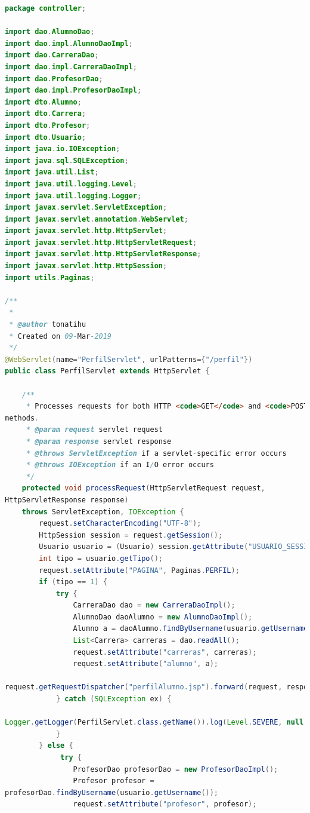 \documentclass[a4paper,12pt]{article}
\begin{document}
\begin{lstlisting}[language=Java, style=customJava, 
caption={PerfilServlet.java}, captionpos=b,basicstyle=\fontfamily{cmss}\small]
package controller;

import dao.AlumnoDao;
import dao.impl.AlumnoDaoImpl;
import dao.CarreraDao;
import dao.impl.CarreraDaoImpl;
import dao.ProfesorDao;
import dao.impl.ProfesorDaoImpl;
import dto.Alumno;
import dto.Carrera;
import dto.Profesor;
import dto.Usuario;
import java.io.IOException;
import java.sql.SQLException;
import java.util.List;
import java.util.logging.Level;
import java.util.logging.Logger;
import javax.servlet.ServletException;
import javax.servlet.annotation.WebServlet;
import javax.servlet.http.HttpServlet;
import javax.servlet.http.HttpServletRequest;
import javax.servlet.http.HttpServletResponse;
import javax.servlet.http.HttpSession;
import utils.Paginas;

/**
 *
 * @author tonatihu
 * Created on 09-Mar-2019
 */
@WebServlet(name="PerfilServlet", urlPatterns={"/perfil"})
public class PerfilServlet extends HttpServlet {
   
    /** 
     * Processes requests for both HTTP <code>GET</code> and <code>POST</code> 
methods.
     * @param request servlet request
     * @param response servlet response
     * @throws ServletException if a servlet-specific error occurs
     * @throws IOException if an I/O error occurs
     */
    protected void processRequest(HttpServletRequest request, 
HttpServletResponse response)
    throws ServletException, IOException {
        request.setCharacterEncoding("UTF-8");
        HttpSession session = request.getSession();
        Usuario usuario = (Usuario) session.getAttribute("USUARIO_SESSION");
        int tipo = usuario.getTipo();
        request.setAttribute("PAGINA", Paginas.PERFIL);
        if (tipo == 1) {
            try {
                CarreraDao dao = new CarreraDaoImpl();
                AlumnoDao daoAlumno = new AlumnoDaoImpl();
                Alumno a = daoAlumno.findByUsername(usuario.getUsername());
                List<Carrera> carreras = dao.readAll();
                request.setAttribute("carreras", carreras);
                request.setAttribute("alumno", a);
                
request.getRequestDispatcher("perfilAlumno.jsp").forward(request, response);
            } catch (SQLException ex) {
                
Logger.getLogger(PerfilServlet.class.getName()).log(Level.SEVERE, null, ex);
            }
        } else {
             try {
                ProfesorDao profesorDao = new ProfesorDaoImpl();
                Profesor profesor = 
profesorDao.findByUsername(usuario.getUsername());
                request.setAttribute("profesor", profesor);
                

\end{lstlisting}
\end{document}
